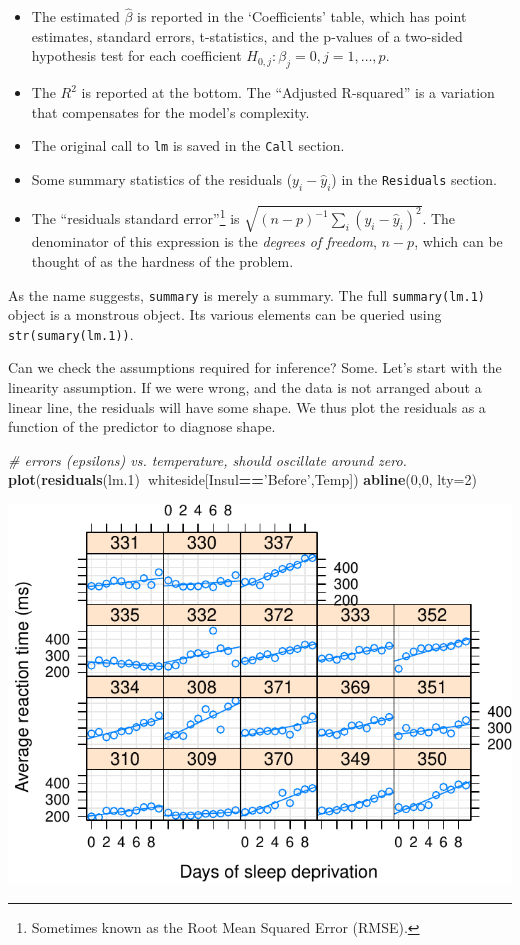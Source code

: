 \documentclass[]{book}
\newenvironment{Shaded}{\begin{snugshade}}{\end{snugshade}}
\newcommand{\CommentTok}[1]{\textcolor[rgb]{0.56,0.35,0.01}{\textit{#1}}}
\newcommand{\DataTypeTok}[1]{\textcolor[rgb]{0.13,0.29,0.53}{#1}}
\newcommand{\DecValTok}[1]{\textcolor[rgb]{0.00,0.00,0.81}{#1}}
\newcommand{\FloatTok}[1]{\textcolor[rgb]{0.00,0.00,0.81}{#1}}
\newcommand{\KeywordTok}[1]{\textcolor[rgb]{0.13,0.29,0.53}{\textbf{#1}}}
\newcommand{\NormalTok}[1]{#1}
\newcommand{\OperatorTok}[1]{\textcolor[rgb]{0.81,0.36,0.00}{\textbf{#1}}}
\newcommand{\StringTok}[1]{\textcolor[rgb]{0.31,0.60,0.02}{#1}}
\providecommand{\tightlist}{%
  \setlength{\itemsep}{0pt}\setlength{\parskip}{0pt}}
\theoremstyle{definition}
\theoremstyle{definition}
\theoremstyle{definition}
\theoremstyle{remark}
\begin{document}
\begin{itemize}
\tightlist
\item
  The estimated \(\hat \beta\) is reported in the `Coefficients' table, which has point estimates, standard errors, t-statistics, and the p-values of a two-sided hypothesis test for each coefficient \(H_{0,j}:\beta_j=0, j=1,\dots,p\).
\item
  The \(R^2\) is reported at the bottom. The ``Adjusted R-squared'' is a variation that compensates for the model's complexity.
\item
  The original call to \texttt{lm} is saved in the \texttt{Call} section.
\item
  Some summary statistics of the residuals (\(y_i-\hat y_i\)) in the \texttt{Residuals} section.
\item
  The ``residuals standard error''\footnote{Sometimes known as the Root Mean Squared Error (RMSE).} is \(\sqrt{(n-p)^{-1} \sum_i (y_i-\hat y_i)^2}\). The denominator of this expression is the \emph{degrees of freedom}, \(n-p\), which can be thought of as the hardness of the problem.
\end{itemize}

As the name suggests, \texttt{summary} is merely a summary. The full \texttt{summary(lm.1)} object is a monstrous object.
Its various elements can be queried using \texttt{str(sumary(lm.1))}.

Can we check the assumptions required for inference?
Some.
Let's start with the linearity assumption.
If we were wrong, and the data is not arranged about a linear line, the residuals will have some shape. We thus plot the residuals as a function of the predictor to diagnose shape.

\begin{Shaded}
\begin{Highlighting}[]
\CommentTok{# errors (epsilons) vs. temperature, should oscillate around zero.}
\KeywordTok{plot}\NormalTok{(}\KeywordTok{residuals}\NormalTok{(lm}\FloatTok{.1}\NormalTok{)}\OperatorTok{~}\NormalTok{whiteside[Insul}\OperatorTok{==}\StringTok{'Before'}\NormalTok{,Temp])}
\KeywordTok{abline}\NormalTok{(}\DecValTok{0}\NormalTok{,}\DecValTok{0}\NormalTok{, }\DataTypeTok{lty=}\DecValTok{2}\NormalTok{)}
\end{Highlighting}
\end{Shaded}

\includegraphics[width=0.5\linewidth]{Rcourse_files/figure-latex/unnamed-chunk-161-1}
\end{document}
